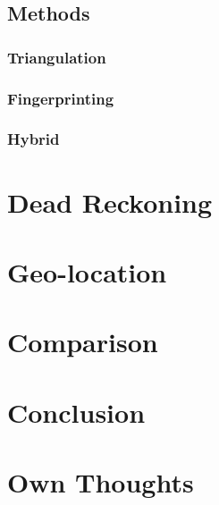 \documentclass[12pt,a4paper]{article}
\begin{document}
\subsection{Methods}
\subsubsection{Triangulation}

\subsubsection{Fingerprinting}
\subsubsection{Hybrid}

\section{Dead Reckoning}


\section{Geo-location}

\section{Comparison}

\section{Conclusion}

\section{Own Thoughts}




\end{document}
